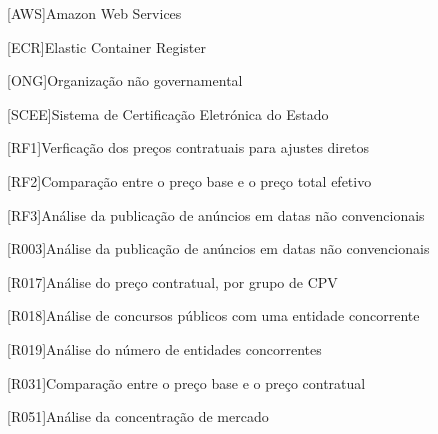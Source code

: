 \begin{multicols}{2}[]
\begin{scriptsize}
\begin{acronym}
                    [AWS]{Amazon Web Services}
                    
                    [ECR]{Elastic Container Register}
                    
                    [ONG]{Organização não governamental}
                    
                    [SCEE]{Sistema de Certificação Eletrónica do Estado}
                    
                    [RF1]{Verficação dos preços contratuais para ajustes diretos}
                    
                    [RF2]{Comparação entre o preço base e o preço total efetivo}
                    
                    [RF3]{Análise da publicação de anúncios em datas não convencionais}
                    
                    [R003]{Análise da publicação de anúncios em datas não convencionais}
                    
                    [R017]{Análise do preço contratual, por grupo de CPV}
                    
                    [R018]{Análise de concursos públicos com uma entidade concorrente}
                    
                    [R019]{Análise do número de entidades concorrentes}
                    
                    [R031]{Comparação entre o preço base e o preço contratual}
                    
                    [R051]{Análise da concentração de mercado}
                                        
    	\end{acronym}
	\end{scriptsize}
\end{multicols}
\clearemptydoublepage
